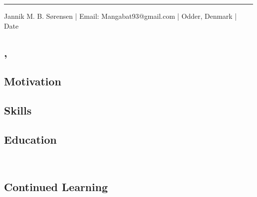 \documentclass{article}
\begin{document}
\rule{\linewidth}{1pt} %

\begin{center}
    Jannik M. B. Sørensen |
    Email: Mangabat93@gmail.com | 
    Odder, Denmark | Date
\end{center}

\subsection*{\finalJobtitle, \finalCompanyName}
    \begin{spacing}{1.2}
        {\finalIntroduction}
    \end{spacing}
    \vspace*{0mm}

\subsection*{Motivation}
    \begin{spacing}{1.2}
        {\finalMotivation}
    \end{spacing}
    \vspace*{0mm}

\subsection*{Skills}
    \begin{spacing}{1.2}
        {\finalSkills}
    \end{spacing}
    \vspace*{0mm}

\subsection*{Education}
    \begin{spacing}{1.2}
        {\finalEducationMaster}\\
        {\finalEducationBachelor}
    \end{spacing}
    \vspace*{0mm}

    

\subsection*{Continued Learning}
    \begin{spacing}{1.2}
        {\finalContinuedLearning}
    \end{spacing}
    \vspace*{0mm}
\end{document}
